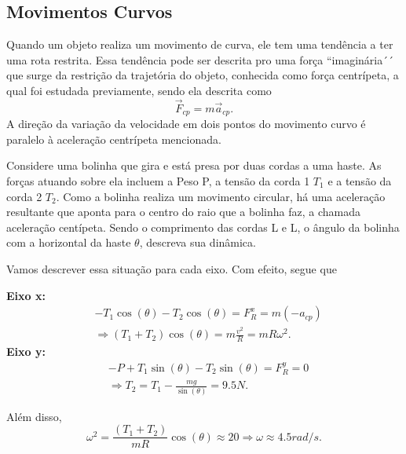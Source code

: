 \documentclass[physics_notes.tex]{subfiles}
\begin{document}
\subsection{Movimentos Curvos}
Quando um objeto realiza um movimento de curva, ele tem uma tendência
a ter uma rota restrita. Essa tendência pode ser descrita pro uma força ``imaginária´´
que surge da restrição da trajetória do objeto, conhecida como
força centrípeta, a qual foi estudada previamente, sendo ela descrita como
\[
	\vec{F}_{cp} = m \vec{a}_{cp}.
\]
A direção da variação da velocidade em dois pontos do movimento curvo
é paralelo à aceleração centrípeta mencionada.
\begin{example}
	Considere uma bolinha que gira e está presa por duas cordas a uma haste.
	As forças atuando sobre ela incluem a Peso P, a tensão da corda 1 \(T_{1}\)
	e a tensão da corda 2 \(T_{2}\). Como a bolinha realiza um movimento circular,
	há uma aceleração resultante que aponta para o centro do raio que a bolinha faz,
	a chamada aceleração centípeta. Sendo o comprimento das cordas L e L, o ângulo
	da bolinha com a horizontal da haste \(\theta \), descreva sua dinâmica.

	Vamos descrever essa situação para cada eixo. Com efeito, segue que

	\textbf{Eixo x:}
	\begin{align*}
		 & -T_{1}\cos{(\theta )} - T_{2}\cos{(\theta )} = F_{R}^{x} = m(-a_{cp})   \\
		 & \Rightarrow (T_{1}+T_{2})\cos{(\theta )}=m \frac{v^2}{R} = mR\omega ^2.
	\end{align*}
	\textbf{Eixo y:}
	\begin{align*}
		 & -P + T_{1}\sin{(\theta )}-T_{2}\sin{(\theta )}=F_{R}^y = 0     \\
		 & \Rightarrow T_{2} = T_{1} - \frac{mg}{\sin{(\theta )}} = 9.5N.
	\end{align*}

	Além disso,
	\[
		\omega ^2 = \frac{(T_{1}+T_{2})}{mR}\cos{(\theta )}\approx 20 \Rightarrow \omega \approx 4.5rad/s.
	\]


\end{example}
\end{document}
